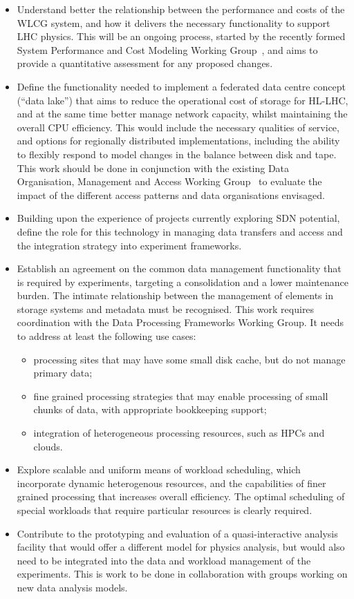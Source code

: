 \begin{itemize}
\item
  Understand better the relationship between the performance and costs
  of the WLCG system, and how it delivers the necessary functionality to
  support LHC physics. This will be an ongoing process, started by the
  recently formed System Performance and Cost Modeling Working Group~\cite{SPCMWG},
  and aims to provide a quantitative assessment for any proposed
  changes.
\item
  Define the functionality needed to implement a federated data centre
  concept (``data lake'') that aims to reduce the operational cost of
  storage for HL-LHC, and at the same time better manage network
  capacity, whilst maintaining the overall CPU efficiency. This would
  include the necessary qualities of service, and options for regionally
  distributed implementations, including the ability to flexibly respond
  to model changes in the balance between disk and tape. This work
  should be done in conjunction with the existing Data Organisation,
  Management and Access Working Group~\cite{WLCG-DOMA} to evaluate the impact of the
  different access patterns and data organisations envisaged.
\item
  Building upon the experience of projects currently exploring SDN
  potential, define the role for this technology in managing data transfers and
  access and the integration strategy into experiment frameworks.
\item
  Establish an agreement on the common data management functionality
  that is required by experiments, targeting a consolidation and a lower
  maintenance burden. The intimate relationship between the management
  of elements in storage systems and metadata must be recognised. This
  work requires coordination with the Data Processing Frameworks
  Working Group. It
  needs to address at least the following use cases:

  \begin{itemize}
  \item
    processing sites that may have some small disk cache, but do not
    manage primary data;
  \item
    fine grained processing strategies that may enable processing of
    small chunks of data, with appropriate bookkeeping support;
  \item
    integration of heterogeneous processing resources, such as HPCs and
    clou\-ds.
  \end{itemize}
\item
  Explore scalable and uniform means of workload scheduling, which
  incorporate dynamic heterogenous resources, and the capabilities of
  finer grained processing that increases overall efficiency. The
  optimal scheduling of special workloads that require particular
  resources is clearly required.
\item
  Contribute to the prototyping and evaluation of a quasi-interactive
  analysis facility that would offer a different model for physics
  analysis, but would also need to be integrated into the data and
  workload management of the experiments. This is work to be done in
  collaboration with groups working on new data analysis models.
\end{itemize}


